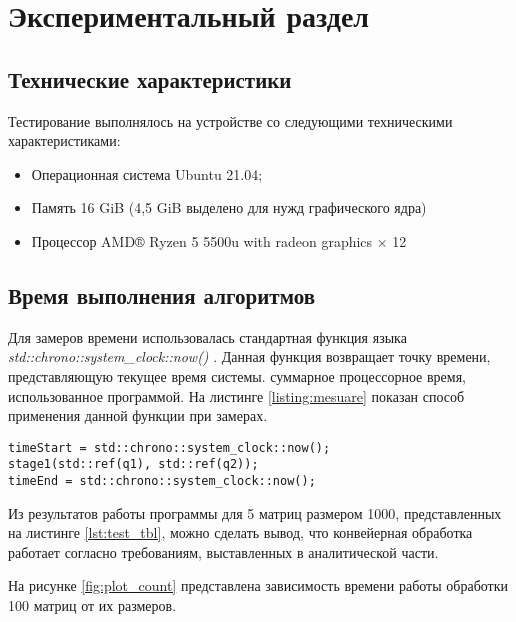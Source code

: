 \chapter{Экспериментальный раздел}
\label{cha:research}

\section{Технические характеристики}
Тестирование выполнялось на устройстве со следующими техническими характеристиками:
\begin{itemize}
	\item Операционная система Ubuntu 21.04;
	\item Память 16 GiB (4,5 GiB выделено для нужд графического ядра)
	\item Процессор AMD® Ryzen 5 5500u with radeon graphics × 12 
\end{itemize}

\section{Время выполнения алгоритмов}

Для замеров времени использовалась стандартная функция языка \textit{std::chrono::system\_clock::now()}  \cite{clock}.  Данная функция возвращает точку времени, представляющую текущее время системы.  суммарное процессорное время, использованное программой. На листинге \ref{listing:mesuare} показан способ применения данной функции при замерах.

\begin{lstlisting}[caption={Замер времени функции}, label=listing:mesuare]
timeStart = std::chrono::system_clock::now();
stage1(std::ref(q1), std::ref(q2));
timeEnd = std::chrono::system_clock::now();
\end{lstlisting}

Из результатов работы программы для 5 матриц размером 1000, представленных на листинге \ref{lst:test_tbl}, можно сделать вывод, что конвейерная обработка работает согласно требованиям, выставленных в аналитической части.




На рисунке \ref{fig:plot_count} представлена зависимость времени работы обработки 100 матриц от их размеров. 



